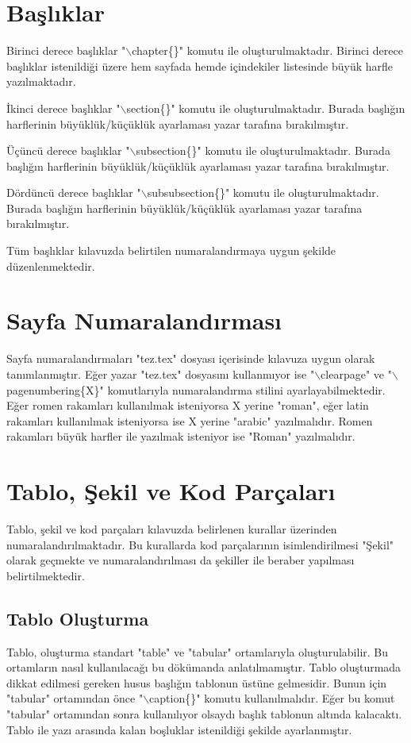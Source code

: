 \chapter{Başlıklar}
Birinci derece başlıklar "$\backslash$chapter\{\}" komutu ile oluşturulmaktadır. Birinci derece başlıklar istenildiği üzere hem sayfada hemde içindekiler listesinde büyük harfle yazılmaktadır. 

İkinci derece başlıklar "$\backslash$section\{\}" komutu ile oluşturulmaktadır. Burada başlığın harflerinin büyüklük/küçüklük ayarlaması yazar tarafına bırakılmıştır.

Üçüncü derece başlıklar "$\backslash$subsection\{\}" komutu ile oluşturulmaktadır. Burada başlığın harflerinin büyüklük/küçüklük ayarlaması yazar tarafına bırakılmıştır.

Dördüncü derece başlıklar "$\backslash$subsubsection\{\}" komutu ile oluşturulmaktadır. Burada başlığın harflerinin büyüklük/küçüklük ayarlaması yazar tarafına bırakılmıştır.

Tüm başlıklar kılavuzda belirtilen numaralandırmaya uygun şekilde düzenlenmektedir. 

\chapter{Sayfa Numaralandırması}
Sayfa numaralandırmaları "tez.tex" dosyası içerisinde kılavuza uygun olarak tanımlanmıştır. Eğer yazar "tez.tex" dosyasını kullanmıyor ise "$\backslash$clearpage" ve "$\backslash$pagenumbering\{X\}" komutlarıyla numaralandırma stilini ayarlayabilmektedir. Eğer romen rakamları kullanılmak isteniyorsa X yerine "roman", eğer latin rakamları kullanılmak isteniyorsa ise X yerine "arabic" yazılmalıdır. Romen rakamları büyük harfler ile yazılmak isteniyor ise "Roman" yazılmalıdır.  

\chapter{Tablo, Şekil ve Kod Parçaları}
Tablo, şekil ve kod parçaları kılavuzda belirlenen kurallar üzerinden numaralandırılmaktadır. Bu kurallarda kod parçalarının isimlendirilmesi "Şekil" olarak geçmekte ve numaralandırılması da şekiller ile beraber yapılması belirtilmektedir. 

\section{Tablo Oluşturma}
Tablo, oluşturma standart "table" ve "tabular" ortamlarıyla oluşturulabilir. Bu ortamların nasıl kullanılacağı bu dökümanda anlatılmamıştır. Tablo oluşturmada dikkat edilmesi gereken husus başlığın tablonun üstüne gelmesidir. Bunun için "tabular" ortamından önce "$\backslash$caption\{\}" komutu kullanılmalıdır. Eğer bu komut "tabular" ortamından sonra kullanılıyor olsaydı başlık tablonun altında kalacaktı. Tablo ile yazı arasında kalan boşluklar istenildiği şekilde ayarlanmıştır. 

